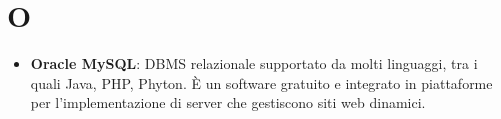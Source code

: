 \section{O}
\begin{itemize}
	\item \textbf{Oracle MySQL}: DBMS relazionale supportato da molti linguaggi, tra i quali Java, PHP, Phyton. \MakeUppercase{è} un software gratuito e integrato in piattaforme per l'implementazione di server che gestiscono siti web dinamici.
\end{itemize}
